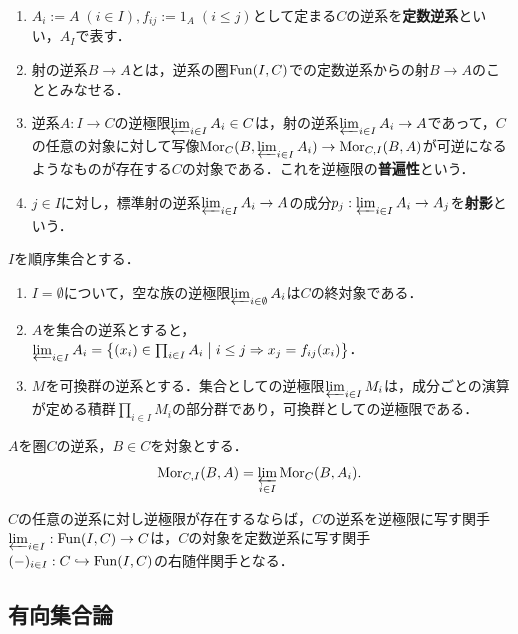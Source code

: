 \documentclass[uplatex,dvipdfmx]{jsreport}
\begin{document}
\begin{definition}\mbox{}
    \begin{enumerate}
        \item $A_i:=A\;(i\in I),f_{ij}:=1_A\;(i\le j)$として定まる$C$の逆系を\textbf{定数逆系}といい，$A_I$で表す．
        \item 射の逆系$B\to A$とは，逆系の圏$\mathrm{Fun}(I,C)$での定数逆系からの射$B\to A$のこととみなせる．
        \item 逆系$A:I\to C$の逆極限$\varprojlim_{i\in I}A_i\in C$は，射の逆系$\varprojlim_{i\in I}A_i\to A$であって，$C$の任意の対象に対して写像$\mathrm{Mor}_C(B,\varprojlim_{i\in I}A_i)\to\mathrm{Mor}_{C,I}(B,A)$が可逆になるようなものが存在する$C$の対象である．これを逆極限の\textbf{普遍性}という．
        \item $j\in I$に対し，標準射の逆系$\varprojlim_{i\in I}A_i\to A$の成分$p_j:\varprojlim_{i\in I}A_i\to A_j$を\textbf{射影}という．
    \end{enumerate}
\end{definition}
\begin{example}
    $I$を順序集合とする．
    \begin{enumerate}
        \item $I=\emptyset$について，空な族の逆極限$\varprojlim_{i\in\emptyset}A_i$は$C$の終対象である．
        \item $A$を集合の逆系とすると，$\varprojlim_{i\in I}A_i=\left\{(x_i)\in\prod_{i\in I}A_i\;\middle|\;i\le j\Rightarrow x_j=f_{ij}(x_i)\right\}$．
        \item $M$を可換群の逆系とする．集合としての逆極限$\varprojlim_{i\in I}M_i$は，成分ごとの演算が定める積群$\prod_{i\in I}M_i$の部分群であり，可換群としての逆極限である．
    \end{enumerate}
\end{example}

\begin{proposition}
    $A$を圏$C$の逆系，$B\in C$を対象とする．\[\mathrm{Mor}_{C,I}(B,A)=\varprojlim_{i\in I}\mathrm{Mor}_C(B,A_i).\]
\end{proposition}

\begin{proposition}
    $C$の任意の逆系に対し逆極限が存在するならば，$C$の逆系を逆極限に写す関手$\varprojlim_{i\in I}:\mathrm{Fun}(I,C)\to C$は，$C$の対象を定数逆系に写す関手$(-)_{i\in I}:C\hookrightarrow\mathrm{Fun}(I,C)$の右随伴関手となる．
\end{proposition}

\subsection{有向集合論}
\end{document}
